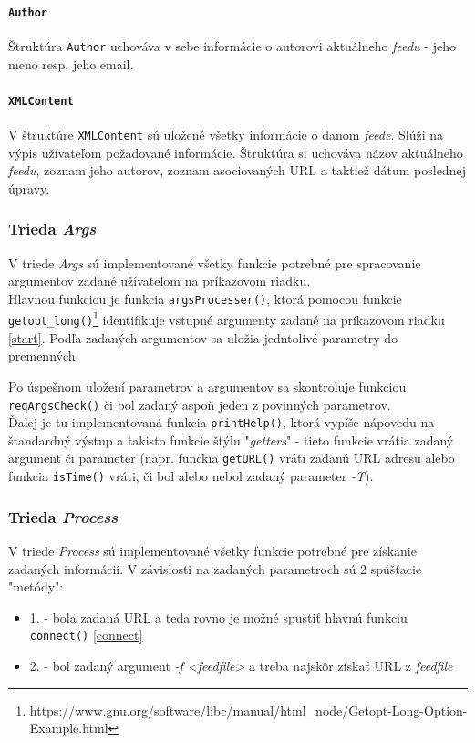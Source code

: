 \documentclass[a4paper, 11pt]{article}
\begin{document}
    \paragraph{\texttt{Author}}
    \label{author}
    Štruktúra \texttt{Author} uchováva v sebe informácie o autorovi aktuálneho \textit{feedu} - jeho meno resp. jeho email.

    \paragraph{\texttt{XMLContent}}
    \label{content}
    V štruktúre \texttt{XMLContent} sú uložené všetky informácie o danom \textit{feede}. Slúži na výpis užívateľom požadované informácie. Štruktúra si uchováva názov aktuálneho \textit{feedu}, zoznam jeho autorov, zoznam asociovaných URL a taktiež dátum poslednej úpravy.

    \subsubsection{Trieda \textit{Args}}
    \label{Args}
    V triede \textit{Args} sú implementované všetky funkcie potrebné pre spracovanie argumentov zadané užívateľom na príkazovom riadku. \\ 

    Hlavnou funkciou je funkcia \texttt{argsProcesser()}, ktorá pomocou funkcie \texttt{getopt\_long()}\footnote{https://www.gnu.org/software/libc/manual/html\_node/Getopt-Long-Option-Example.html} identifikuje vstupné argumenty zadané na príkazovom riadku \ref{start}. Podľa zadaných argumentov sa uložia jedntolivé parametry do premenných. 
	
    Po úspešnom uložení parametrov a argumentov sa skontroluje funkciou \texttt{reqArgsCheck()} či bol zadaný aspoň jeden z povinných parametrov. \\
	
    Ďalej je tu implementovaná funkcia \texttt{printHelp()}, ktorá vypíše nápovedu na štandardný výstup a takisto funkcie štýlu "\textit{getters}" - tieto funkcie vrátia zadaný argument či parameter (napr. funckia \texttt{getURL()} vráti zadanú URL adresu alebo funkcia \texttt{isTime()} vráti, či bol alebo nebol zadaný parameter \textit{-T}). \\

    \subsubsection{Trieda \textit{Process}}
    \label{Process}
    V triede \textit{Process} sú implementované všetky funkcie potrebné pre získanie zadaných informácií. V závislosti na zadaných parametroch sú 2 spúšťacie "metódy": 
    \begin{itemize}
        \item 1. - bola zadaná URL a teda rovno je možné spustiť hlavnú funkciu \texttt{connect()} \ref{connect}
	\item 2. - bol zadaný argument \textit{-f <feedfile>} a treba najskôr získať URL z \textit{feedfile}
    \end{itemize}
	
\end{document}
